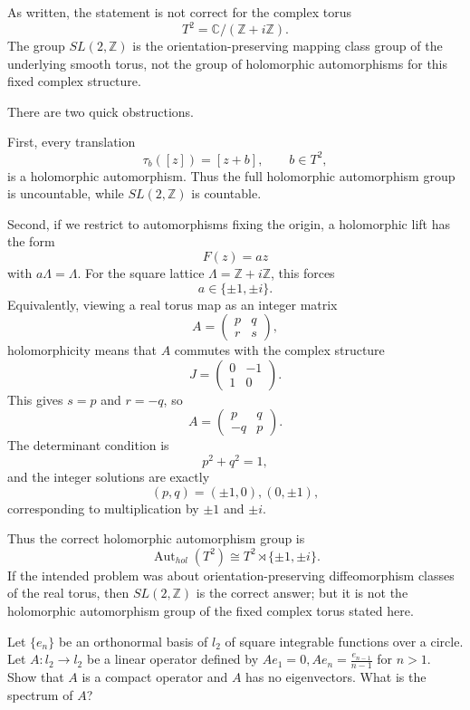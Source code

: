 \begin{solution}
As written, the statement is not correct for the complex torus
\[
T^2=\mathbb C/(\mathbb Z+i\mathbb Z).
\]
The group $SL(2,\mathbb Z)$ is the orientation-preserving mapping class group of the underlying smooth torus, not the group of holomorphic automorphisms for this fixed complex structure.

There are two quick obstructions.

First, every translation
\[
\tau_b([z])=[z+b],\qquad b\in T^2,
\]
is a holomorphic automorphism. Thus the full holomorphic automorphism group is uncountable, while $SL(2,\mathbb Z)$ is countable.

Second, if we restrict to automorphisms fixing the origin, a holomorphic lift has the form
\[
F(z)=az
\]
with $a\Lambda=\Lambda$. For the square lattice $\Lambda=\mathbb Z+i\mathbb Z$, this forces
\[
a\in\{\pm 1,\pm i\}.
\]
Equivalently, viewing a real torus map as an integer matrix
\[
A=\begin{pmatrix}p&q\\ r&s\end{pmatrix},
\]
holomorphicity means that $A$ commutes with the complex structure
\[
J=\begin{pmatrix}0&-1\\ 1&0\end{pmatrix}.
\]
This gives $s=p$ and $r=-q$, so
\[
A=\begin{pmatrix}p&q\\ -q&p\end{pmatrix}.
\]
The determinant condition is
\[
p^2+q^2=1,
\]
and the integer solutions are exactly
\[
(p,q)=(\pm 1,0),(0,\pm 1),
\]
corresponding to multiplication by $\pm1$ and $\pm i$.

Thus the correct holomorphic automorphism group is
\[
\operatorname{Aut}_{hol}(T^2)\cong T^2\rtimes\{\pm1,\pm i\}.
\]
If the intended problem was about orientation-preserving diffeomorphism classes of the real torus, then $SL(2,\mathbb Z)$ is the correct answer; but it is not the holomorphic automorphism group of the fixed complex torus stated here.
\end{solution}

\begin{exercise}
\label{analysis:2016:11}
Let $\{e_n\}$ be an orthonormal basis of $l_2$ of square integrable functions over a circle. Let $A: l_2 \to l_2$ be a linear operator defined by $A e_1 = 0, A e_n = \frac{e_{n-1}}{n-1}$ for $n > 1$. Show that $A$ is a compact operator and $A$ has no eigenvectors. What is the spectrum of $A$?
\end{exercise}

